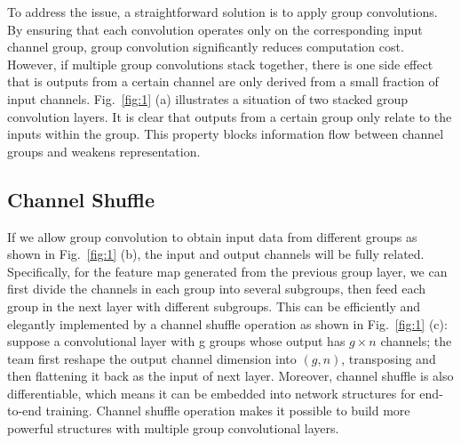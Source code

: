 \documentclass[10pt,twocolumn,letterpaper]{article}
\begin{document}
To address the issue, a straightforward solution is to apply group convolutions. By ensuring that each convolution operates only on the corresponding input channel group, group convolution significantly reduces computation cost. However, if multiple group convolutions stack together, there is one side effect that is outputs from a certain channel are only derived from a small fraction of input channels. Fig.~\ref{fig:1} (a) illustrates a situation of two stacked group convolution layers. It is clear that outputs from a certain group only relate to the inputs within the group. This property blocks information flow between channel groups and weakens representation.

\subsection{Channel Shuffle}

If we allow group convolution to obtain input data from different groups as shown in Fig.~\ref{fig:1} (b), the input and output channels will be fully related. Specifically, for the feature map generated from the previous group layer, we can first divide the channels in each group into several subgroups, then feed each group in the next layer with different subgroups. This can be efficiently and elegantly implemented by a channel shuffle operation as shown in Fig.~\ref{fig:1} (c): suppose a convolutional layer with g groups whose output has $g\times n$ channels; the team first reshape the output channel dimension into $(g , n)$, transposing and then flattening it back as the input of next layer. Moreover, channel shuffle is also differentiable, which means it can be embedded into network structures for end-to-end training. Channel shuffle operation makes it possible to build more powerful structures with multiple group convolutional layers.
\end{document}
